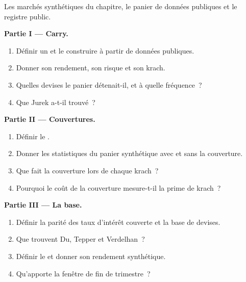 \begin{problem}\label{pb:s2:cross-currency-basis-and-fx-carry:1}
Les marchés synthétiques du chapitre, le panier de données publiques et le registre public.

\medskip\noindent\textbf{Partie I --- Carry.}
\begin{enumerate}
\item Définir un  et le construire à partir de données publiques.
\item Donner son rendement, son risque et son krach.
\item Quelles devises le panier détenait-il, et à quelle fréquence~?
\item Que Jurek a-t-il trouvé~?
\end{enumerate}

\medskip\noindent\textbf{Partie II --- Couvertures.}
\begin{enumerate}[resume]
\item Définir le .
\item Donner les statistiques du panier synthétique avec et sans la couverture.
\item Que fait la couverture lors de chaque krach~?
\item Pourquoi le coût de la couverture mesure-t-il la prime de krach~?
\end{enumerate}

\medskip\noindent\textbf{Partie III --- La base.}
\begin{enumerate}[resume]
\item Définir la parité des taux d'intérêt couverte et la base de devises.
\item Que trouvent Du, Tepper et Verdelhan~?
\item Définir le  et donner son rendement synthétique.
\item Qu'apporte la fenêtre de fin de trimestre~?
\end{enumerate}


\end{problem}
